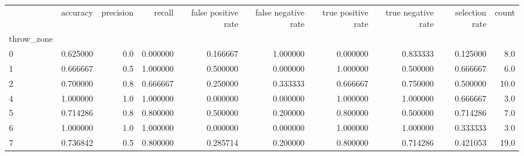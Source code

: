 \begin{tabular}{lrrrrrrrrr}
\toprule
{} &  accuracy &  precision &    recall &  false positive rate &  false negative rate &  true positive rate &  true negative rate &  selection rate &  count \\
throw\_zone &           &            &           &                      &                      &                     &                     &                 &        \\
\midrule
0          &  0.625000 &        0.0 &  0.000000 &             0.166667 &             1.000000 &            0.000000 &            0.833333 &        0.125000 &    8.0 \\
1          &  0.666667 &        0.5 &  1.000000 &             0.500000 &             0.000000 &            1.000000 &            0.500000 &        0.666667 &    6.0 \\
2          &  0.700000 &        0.8 &  0.666667 &             0.250000 &             0.333333 &            0.666667 &            0.750000 &        0.500000 &   10.0 \\
4          &  1.000000 &        1.0 &  1.000000 &             0.000000 &             0.000000 &            1.000000 &            1.000000 &        0.666667 &    3.0 \\
5          &  0.714286 &        0.8 &  0.800000 &             0.500000 &             0.200000 &            0.800000 &            0.500000 &        0.714286 &    7.0 \\
6          &  1.000000 &        1.0 &  1.000000 &             0.000000 &             0.000000 &            1.000000 &            1.000000 &        0.333333 &    3.0 \\
7          &  0.736842 &        0.5 &  0.800000 &             0.285714 &             0.200000 &            0.800000 &            0.714286 &        0.421053 &   19.0 \\
\bottomrule
\end{tabular}
